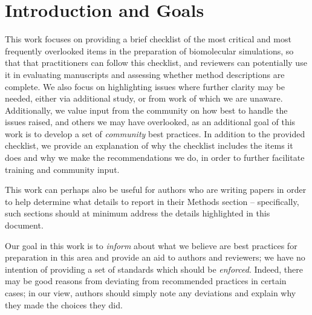 \documentclass[9pt,bestpractices]{livecoms}
\begin{document}
\section{Introduction and Goals}
This work focuses on providing a brief checklist of the most critical and most frequently overlooked items in the preparation of biomolecular simulations, so that that practitioners can follow this checklist, and reviewers can potentially use it in evaluating manuscripts and assessing whether method descriptions are complete. 
We also focus on highlighting issues where further clarity may be needed, either via additional study, or from work of which we are unaware.
Additionally, we value input from the community on how best to handle the issues raised, and others we may have overlooked, as an additional goal of this work is to develop a set of \emph{community} best practices.
In addition to the provided checklist, we provide an explanation of why the checklist includes the items it does and why we make the recommendations we do, in order to further facilitate training and community input.

This work can perhaps also be useful for authors who are writing papers in order to help determine what details to report in their Methods section -- specifically, such sections should at minimum address the details highlighted in this document. 

Our goal in this work is to \emph{inform} about what we believe are best practices for preparation in this area and provide an aid to authors and reviewers; we have no intention of providing a set of standards which should be \emph{enforced}. 
Indeed, there may be good reasons from deviating from recommended practices in certain cases; in our view, authors should simply note any deviations and explain why they made the choices they did. 


\end{document}
